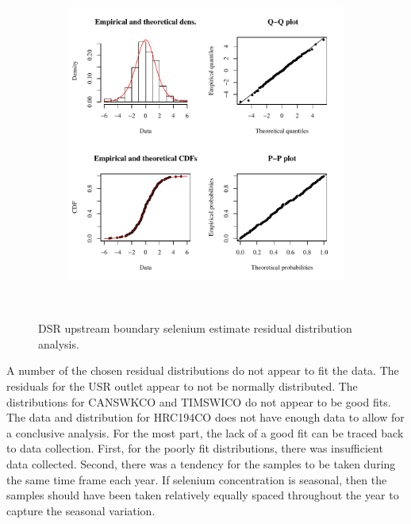 \begin{linenumbers}
\subfiguremid
\begin{landscape}
	\begin{figure}
		\begin{subfigure}{0.7\textwidth}
			\centering
			\includegraphics[width=\tableCustomSize]{"Figures/Results_DSR/Stochastic/Conc Model res-fit DDIV"}
		\end{subfigure}\\
		\caption{DSR upstream boundary selenium estimate residual distribution analysis.}
	\end{figure}
\end{landscape}
\subfiguretop

A number of the chosen residual distributions do not appear to fit the data.  The residuals for the USR outlet appear to not be normally distributed.  The distributions for CANSWKCO and TIMSWICO do not appear to be good fits.  The data and distribution for HRC194CO does not have enough data to allow for a conclusive analysis.  For the most part, the lack of a good fit can be traced back to data collection.  First, for the poorly fit distributions, there was insufficient data collected.  Second, there was a tendency for the samples to be taken during the same time frame each year.  If selenium concentration is seasonal, then the samples should have been taken relatively equally spaced throughout the year to capture the seasonal variation.


\end{linenumbers}
